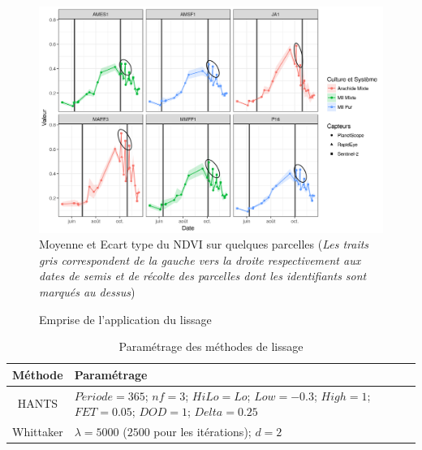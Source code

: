 \begin{figure}[htbp]
 \begin{center}
  \includegraphics[scale=0.23]{materiels_methodes/multisource.png} 
 \end{center}
 \caption[Moyenne et Ecart type du NDVI sur quelques parcelles]{Moyenne et Ecart type du NDVI sur quelques parcelles (\emph{Les traits gris correspondent de la gauche vers la droite respectivement aux dates de semis et de récolte des parcelles dont les identifiants sont marqués au dessus})}
 \label{fig-multisource}
\end{figure}

\begin{figure}[htbp]
 \begin{center}
 \end{center}
 \caption{Emprise de l'application du lissage}
 \label{fig-carte-lissage}
\end{figure}

\begin{table}[htbp]
\begin{center}
\caption{Paramétrage des méthodes de lissage}
\label{tab-param-hants-whit}
 \begin{tabular}{c>{\centering\arraybackslash}p{10cm}}
  \hline
  Méthode & Paramétrage\\
  \hline
  HANTS & $P\acute{e}riode = 365$; $nf = 3$; $HiLo = Lo$; $Low=-0.3$; $High=1$; $FET=0.05$; $DOD=1$; $Delta=0.25$ \\
  Whittaker & $\lambda = 5000$ ($2500$ pour les itérations); $d = 2$ \\
  \hline
 \end{tabular}
\end{center}
\end{table}

